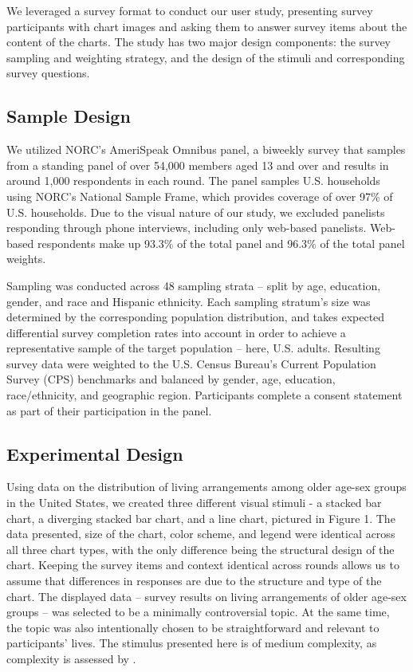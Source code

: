 \documentclass{IEEEcsmag}
\begin{document}
We leveraged a survey format to conduct our user study, presenting survey participants with chart images and asking them to answer survey items about the content of the charts. The study has two major design components: the survey sampling and weighting strategy, and the design of the stimuli and corresponding survey questions.

\subsection{Sample Design}\label{sample-design}

We utilized NORC's AmeriSpeak Omnibus panel, a biweekly survey that samples from a standing panel of over 54,000 members aged 13 and over  and results in around 1,000 respondents in each round. The panel samples U.S. households using NORC's National Sample Frame, which provides coverage of over 97\% of U.S. households. Due to the visual nature of our study, we excluded panelists responding through phone interviews, including only web-based panelists. Web-based respondents make up 93.3\% of the total panel and 96.3\% of the total panel weights.

Sampling was conducted across 48 sampling strata -- split by age, education, gender, and race and Hispanic ethnicity. Each sampling stratum's size was determined by the corresponding population distribution, and takes expected differential survey completion rates into account in order to achieve a representative sample of the target population -- here, U.S. adults. Resulting survey data were weighted to the U.S. Census Bureau's Current Population Survey (CPS) benchmarks and balanced by gender, age, education, race/ethnicity, and geographic region. Participants complete a consent statement as part of their participation in the panel.

\subsection{Experimental Design}\label{experimental-design}

Using data on the distribution of living arrangements among older age-sex groups in the United States, we created three different visual stimuli - a stacked bar chart, a diverging stacked bar chart, and a line chart, pictured in Figure 1. The data presented, size of the chart, color scheme, and legend were identical across all three chart types, with the only difference being the structural design of the chart. Keeping the survey items and context identical across rounds allows us to assume that differences in responses are due to the structure and type of the chart. The displayed data -- survey results on living arrangements of older age-sex groups -- was selected to be a minimally controversial topic. At the same time, the topic was also intentionally chosen to be straightforward and relevant to participants' lives. The stimulus presented here is of medium complexity, as complexity is assessed by .
\end{document}
